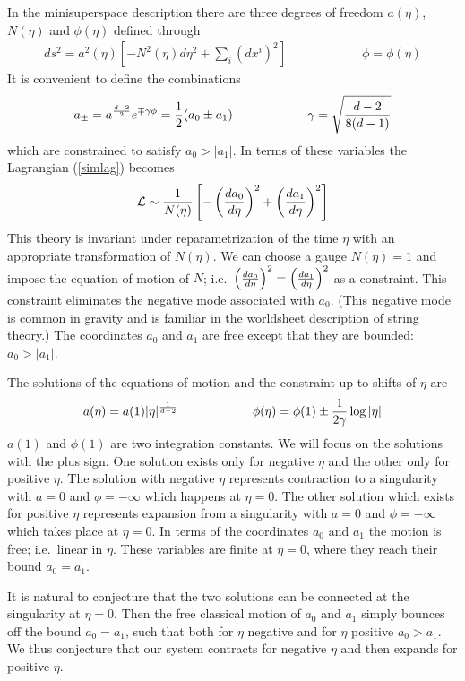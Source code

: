 \documentclass[a4paper,12pt,oneside]{article}
\begin{document}
In the minisuperspace description there are three degrees of
freedom $a(\eta)$, $N(\eta)$ and $\phi(\eta)$ defined through
\begin{eqnarray}
ds^2=a^2(\eta)[-N^2(\eta) d\eta^2 + \sum_i (dx^i)^2 ]
\qquad\qquad\qquad \phi=\phi(\eta)
\end{eqnarray}
It is convenient to define the combinations
\begin{eqnarray}
a_\pm=a^{d-2\over 2} e^{\mp \gamma \phi}={1\over 2} (a_0\pm a_1)
\qquad \qquad\qquad \gamma=\sqrt{d-2 \over 8(d-1)}
\end{eqnarray}
which are constrained to satisfy  $a_0 > |a_1|$.  In terms of
these variables the Lagrangian (\ref{simlag}) becomes
\begin{eqnarray}
{\cal L} \sim { 1\over N(\eta)} \left[ -\left( { da_0 \over
d\eta}\right)^2 + \left( { da_1 \over d\eta}\right)^2 \right]
\end{eqnarray}
This theory is invariant under reparametrization  of the time
$\eta$ with an appropriate transformation of $N(\eta)$.  We can
choose a gauge $N(\eta)=1$ and impose the equation of motion of
$N$; i.e.\  $ \left( { da_0 \over d\eta}\right)^2 = \left( { da_1
\over d\eta}\right)^2$ as a constraint.  This constraint
eliminates the negative mode associated with $a_0$.  (This
negative mode is common in gravity and is familiar in the
worldsheet description of string theory.)  The coordinates $a_0$
and $a_1$ are free except that they are bounded: $a_0 > |a_1|$.

The solutions of the equations of motion and the constraint up to
shifts of $\eta$ are \cite{PBB}
\begin{eqnarray}
a(\eta) = a(1) |\eta|^{1 \over d-2} \qquad\qquad\qquad
\phi(\eta)=\phi(1) \pm {1\over 2\gamma } \log |\eta|
\label{classol}
\end{eqnarray}
$a(1)$ and $\phi(1)$ are two integration constants. We will focus
on the solutions with the plus sign.  One solution exists only
for negative $\eta$ and the other only for positive $\eta$.  The
solution with negative $\eta$ represents contraction to a
singularity with $a=0$ and $\phi=-\infty$ which happens at
$\eta=0$.  The other solution which exists for positive $\eta$
represents expansion from a singularity with $a=0$ and
$\phi=-\infty$ which takes place at $\eta=0$.  In terms of the
coordinates $a_0$ and $a_1$ the motion is free; i.e.\ linear in
$\eta$.  These variables are finite at $\eta=0$, where they reach
their bound $a_0=a_1$.

It is natural to conjecture that the two solutions can be
connected at the singularity at $\eta=0$.  Then the free
classical motion of $a_0$ and $a_1$ simply bounces off the bound
$a_0=a_1$, such that both for $\eta$ negative and for $\eta$
positive $a_0 > a_1$.  We thus conjecture that our system
contracts for negative $\eta$ and then expands for positive
$\eta$.
\end{document}
